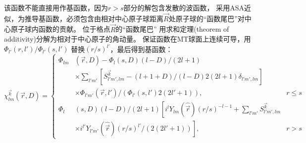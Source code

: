 该函数不能直接用作基函数，因为$r>s$部分的解包含发散的波函数，%
采用ASA近似，为推导基函数，必须包含由相对中心原子球距离$\vec R$处原子球的“函数尾巴”对中心原子球内函数的贡献。%
位于格点$\vec R$的“函数尾巴”%
用求和定理(theorem of additivity)分解为相对于中心原子的角动量。
保证函数在MT球面上连续可导，用$\Phi_{l'}(r,l')/\Phi_{l'}(s,l')$%
替换$(r/s)^{l'}$，最后得到基函数\cite{Nemoshkalenko-Antonov}：
\begin{equation}
  \chi_{lm}^{\vec k}(\vec r,D)=\left\{
  \begin{aligned}
    \Phi_{lm}&(\vec r,D)-\Phi_l(s,D)(l-D)/(2l+1)&\\
    &\times\sum_{l'm'}\left[S_{l'm',lm}^{\vec k}-(l+1+D)/(l-D)2(2l+1)\delta_{l'm',lm}\right]\quad&\\
    &\times\Phi_{l'm'}(\vec r,l')/(\Phi_{l'}(s,l')2(2l'+1)), &r\leqslant s\\
    \Phi_l&(s,D)(l-D)/(2l+1)\left[i^lY_{lm}(\hat{\vec r})(r/s)^{-l-1}\right.+\sum_{l'm'}S_{l'm',lm}^{\vec k}&\\
    &\left.\times i^{l'}Y_{l'm'}(\hat{\vec r})(r/s)^{l'}/(2(2l'+1))\right],&r>s
  \end{aligned}\right.
  \label{eq:solid-143}
\end{equation}
